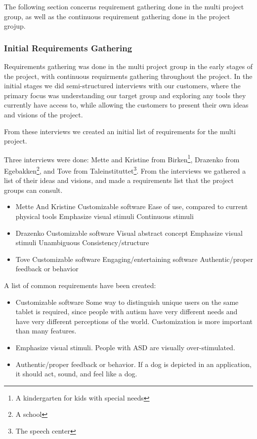The following section concerns requirement gathering done in the multi project group, as well as the continuous requirement gathering done in the project grojup.

\subsubsection*{Initial Requirements Gathering}
Requirements gathering was done in the multi project group in the early stages of the project, with continuous requirments gathering throughout the project.
In the initial stages we did semi-structured interviews with our customers, where the primary focus was understanding our target group and exploring any tools they currently have access to, while allowing the customers to present their own ideas and visions of the project.

From these interviews we created an initial list of requirements for the multi project.

Three interviews were done: Mette and Kristine from Birken\footnote{A kindergarten for kids with special needs}, Drazenko from Egebakken\footnote{A school}, and Tove from Taleinstituttet\footnote{The speech center}.
From the interviews we gathered a list of their ideas and visions, and made a requirements list that the project groups can consult.

\begin{itemize}
 \item Mette And Kristine 
  \subitem Customizable software
  \subitem Ease of use, compared to current physical tools
  \subitem Emphasize visual stimuli
  \subitem Continuous stimuli 
 \item Drazenko
  \subitem Customizable software
  \subitem Visual abstract concept
  \subitem Emphasize visual stimuli
  \subitem Unambiguous
  \subitem Consistency/structure
 \item Tove 
  \subitem Customizable software
  \subitem Engaging/entertaining software
  \subitem Authentic/proper feedback or behavior
\end{itemize}

A list of common requirements have been created:

\begin{itemize}
 \item Customizable software
  \subitem Some way to distinguish unique users on the same tablet is required, since people with autism have very different needs and have very different perceptions of the world.
  \subitem Customization is more important than many features.
 \item Emphasize visual stimuli.
  \subitem People with ASD are visually over-stimulated.
 \item Authentic/proper feedback or behavior.
  \subitem If a dog is depicted in an application, it should act, sound, and feel like a dog.
\end{itemize}


